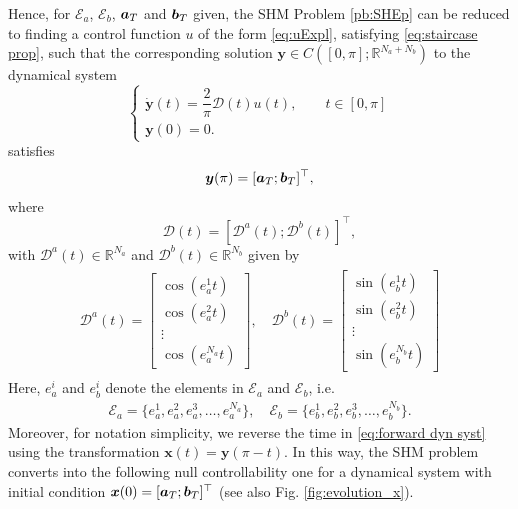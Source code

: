 \documentclass[twocolumn]{autart}    %
\begin{document}
Hence, for $\mathcal{E}_a$, $\mathcal{E}_b$, $\bm{a}_T$ and $\bm{b}_T$ given, the SHM Problem \ref{pb:SHEp} can be reduced to finding a control function $u$ of the form \eqref{eq:uExpl}, satisfying \eqref{eq:staircase prop}, such that the corresponding solution $\bm{y} \in C([0,\pi]; \mathbb{R}^{N_a+N_b})$ to the dynamical system
\begin{equation}\label{eq:forward dyn syst}
	\begin{cases}
		\dot{\bm{y}}(t) = \dfrac{2}{\pi} \bm{\mathcal{D}}(t) u(t), \qquad  t\in [0,\pi]
		\\[5pt]
		\bm{y}(0) = 0.
	\end{cases}
\end{equation}
satisfies
\begin{align*}
	\bm{y} (\pi) = [\bm{a}_T;\bm{b}_T]^\top,	
\end{align*}
where
\begin{equation}\label{eq:Dynamics}
	\bm{\mathcal{D}}(t) = \left[ \bm{\mathcal{D}}^a(t); \bm{\mathcal{D}}^b(t) \right]^\top, 
\end{equation}
with $\bm{\mathcal{D}}^a(t) \in \mathbb{R}^{N_a} $ and $ \bm{\mathcal{D}}^b(t) \in \mathbb{R}^{N_b}$ given by
\begin{gather}\label{eq:DalphaDbeta}
    \begin{align}
        \bm{\mathcal{D}}^a(t) = 
        \begin{bmatrix} 
            \cos(e_a^1t) \\ \cos(e_a^2t) \\ \vdots \\ \cos(e_a^{N_a}t) 
        \end{bmatrix},
        \quad \bm{\mathcal{D}}^b(t) = 
        \begin{bmatrix} 
            \sin(e_b^1t) \\ \sin(e_b^2t) \\ \vdots \\ \sin(e_b^{N_b}t)
        \end{bmatrix} 
    \end{align} 
\end{gather}
Here, $e_a^i$ and $e_b^i$  denote the elements in $\mathcal{E}_a$ and  $\mathcal{E}_b$, i.e.
\begin{align*}
	\mathcal{E}_a = \{e_a^1,e_a^2,e_a^3,\dots,e_a^{N_a}\}, \quad \mathcal{E}_b = \{e_b^1,e_b^2,e_b^3,\dots,e_b^{N_b}\}.
\end{align*}
Moreover, for notation simplicity, we reverse the time in \eqref{eq:forward dyn syst} using the transformation $\bm{x} (t) = \bm{y}(\pi - t)$. In this way, the SHM problem converts into the following null controllability one for a dynamical system with initial condition $\bm{x}(0) = [\bm{a}_T; \bm{b}_T]^\top$ (see also Fig. \ref{fig:evolution_x}).
\end{document}
